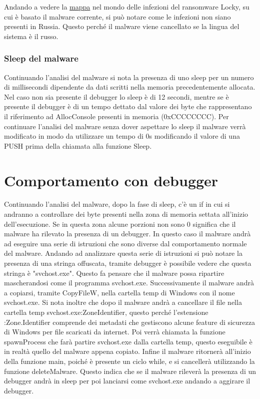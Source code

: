 \documentclass[a4paper,12pt]{article}
\begin{document}
Andando a vedere la \href{https://www.enterprisetimes.co.uk/2017/09/27/another-wave-locky-ransomware-arrives/}{mappa} nel mondo delle infezioni del ransomware Locky, su cui è basato il malware corrente, si può notare come le infezioni non siano presenti in Russia. Questo perché il malware viene cancellato se la lingua del sistema è il russo.

\subsubsection{Sleep del malware}
Continuando l'analisi del malware si nota la presenza di uno sleep per un numero di millisecondi dipendente da dati scritti nella memoria precedentemente allocata. Nel caso non sia presente il debugger lo sleep è di 12 secondi, mentre se è presente il debugger è di un tempo dettato dal valore dei byte che rappresentano il riferimento ad AllocConsole presenti in memoria (0xCCCCCCCC). 
Per continuare l'analisi del malware senza dover aspettare lo sleep il malware verrà modificato in modo da utilizzare un tempo di 0s modificando il valore di una PUSH prima della chiamata alla funzione Sleep. 

\section{Comportamento con debugger}
Continuando l'analisi del malware, dopo la fase di sleep, c'è un if in cui si andranno a controllare dei byte presenti nella zona di memoria settata all'inizio dell'esecuzione. Se in questa zona alcune porzioni non sono 0 significa che il malware ha rilevato la presenza di un debugger. In questo caso il malware andrà ad eseguire una serie di istruzioni che sono diverse dal comportamento normale del malware. Andando ad analizzare questa serie di istruzioni si può notare la presenza di una stringa offuscata, tramite debugger è possibile vedere che questa stringa è "svchost.exe". Questo fa pensare che il malware possa ripartire mascherandosi come il programma svchost.exe. 
Successivamente il malware andrà a copiarsi, tramite CopyFileW, nella cartella temp di Windows con il nome svchost.exe.
Si nota inoltre che dopo il malware andrà a cancellare il file nella cartella temp svchost.exe:ZoneIdentifier, questo perché l'estensione :Zone.Identifier comprende dei metadati che gestiscono alcune feature di sicurezza di Windows per file scaricati da internet. 
Poi verrà chiamata la funzione spawnProcess che farà partire svchost.exe dalla cartella temp, questo eseguibile è in realtà quello del malware appena copiato.  Infine il malware ritornerà all'inizio della funzione main, poiché è presente un ciclo while, e si cancellerà utilizzando la funzione deleteMalware. Questo indica che se il malware rileverà la presenza di un debugger andrà in sleep per poi lanciarsi come svchost.exe andando a aggirare il debugger.
\end{document}
